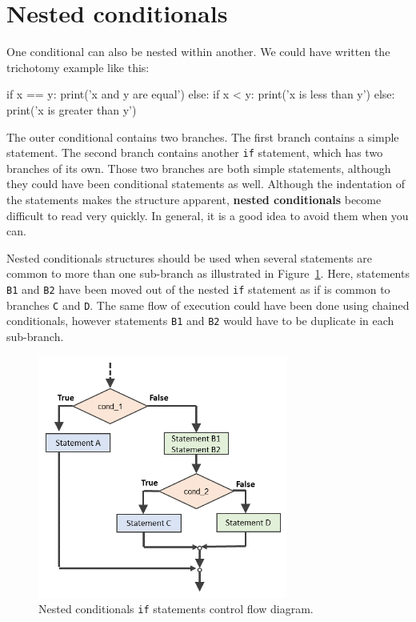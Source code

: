 \section{Nested conditionals}

One conditional can also be nested within another.  We could have
written the trichotomy example like this:

\beforeverb
\begin{pycode}
if x == y:
    print('x and y are equal')
else:
    if x < y:
        print('x is less than y')
    else:
        print('x is greater than y')
\end{pycode}
\afterverb
%
The outer conditional contains two branches.  The
first branch contains a simple statement.  The second branch
contains another {\tt if} statement, which has two branches of its
own.  Those two branches are both simple statements,
although they could have been conditional statements as well.
%
Although the indentation of the statements makes the structure
apparent, {\bf nested conditionals} become difficult to read very
quickly. In general, it is a good idea to avoid them when you can.

Nested conditionals structures should be used when several statements are
common to more than one sub-branch as illustrated in Figure~\ref{fig:nested-if-statements}. 
Here, statements {\tt B1} and {\tt B2} have been moved out of the nested {\tt if} statement as if is common to branches {\tt C} and {\tt D}. The same flow of execution could have been done using chained conditionals, however statements {\tt B1} and {\tt B2} would have to be duplicate in each sub-branch.


\begin{figure}[htb]%
\begin{center}
\includegraphics[height=8cm]{figs/ifnestedstatementsdiagram.png}%
\caption{Nested conditionals {\tt if} statements control flow diagram.}%
\label{fig:nested-if-statements}%
\end{center}
\end{figure}



